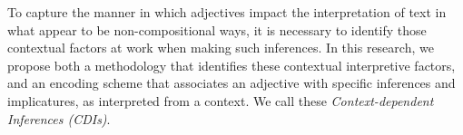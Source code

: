 \documentclass[10pt]{article}
\begin{document}
To capture the manner in which adjectives impact the interpretation of text in what appear to be  non-compositional ways, 
it is necessary to identify those contextual factors at work when making such inferences. In this research, we propose both a methodology that identifies these contextual interpretive factors, and an encoding scheme that associates an adjective with specific inferences and implicatures, as interpreted from a context. We call these {\it Context-dependent Inferences (CDIs)}. 

%
\end{document}

